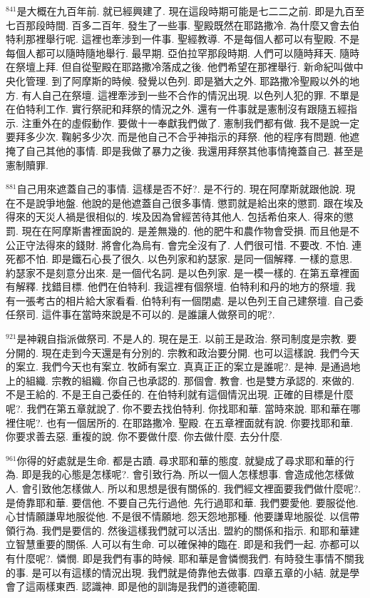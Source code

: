 \documentclass{book}
\begin{document}
$^{841}$是大概在九百年前.
就已經興建了.
現在這段時期可能是七二二之前.
即是九百至七百那段時間.
百多二百年.
發生了一些事.
聖殿既然在耶路撒冷.
為什麼又會去伯特利那裡舉行呢.
這裡也牽涉到一件事.
聖經教導.
不是每個人都可以有聖殿.
不是每個人都可以隨時隨地舉行.
最早期.
亞伯拉罕那段時期.
人們可以隨時拜天.
隨時在祭壇上拜.
但自從聖殿在耶路撒冷落成之後.
他們希望在那裡舉行.
新命紀叫做中央化管理.
到了阿摩斯的時候.
發覺以色列.
即是猶大之外.
耶路撒冷聖殿以外的地方.
有人自己在祭壇.
這裡牽涉到一些不合作的情況出現.
以色列人犯的罪.
不單是在伯特利工作.
實行祭祀和拜祭的情況之外.
還有一件事就是憲制沒有跟隨五經指示.
注重外在的虛假動作.
要做十一奉獻我們做了.
憲制我們都有做.
我不是說一定要拜多少次.
鞠躬多少次.
而是他自己不合乎神指示的拜祭.
他的程序有問題.
他遮掩了自己其他的事情.
即是我做了暴力之後.
我還用拜祭其他事情掩蓋自己.
甚至是憲制贖罪.

$^{881}$自己用來遮蓋自己的事情.
這樣是否不好?.
是不行的.
現在阿摩斯就跟他說.
現在不是說爭地盤.
他說的是他遮蓋自己很多事情.
懲罰就是給出來的懲罰.
跟在埃及得來的天災人禍是很相似的.
埃及因為曾經苦待其他人.
包括希伯來人.
得來的懲罰.
現在在阿摩斯書裡面說的.
是差無幾的.
他的肥牛和農作物會受損.
而且他是不公正守法得來的錢財.
將會化為烏有.
會完全沒有了.
人們很可惜.
不要改.
不怕.
連死都不怕.
即是鐵石心長了很久.
以色列家和約瑟家.
是同一個解釋.
一樣的意思.
約瑟家不是刻意分出來.
是一個代名詞.
是以色列家.
是一模一樣的.
在第五章裡面有解釋.
找錯目標.
他們在伯特利.
我這裡有個祭壇.
伯特利和丹的地方的祭壇.
我有一張考古的相片給大家看看.
伯特利有一個閉處.
是以色列王自己建祭壇.
自己委任祭司.
這件事在當時來說是不可以的.
是誰讓人做祭司的呢?.

$^{921}$是神親自指派做祭司.
不是人的.
現在是王.
以前王是政治.
祭司制度是宗教.
要分開的.
現在走到今天還是有分別的.
宗教和政治要分開.
也可以這樣說.
我們今天的案立.
我們今天也有案立.
牧師有案立.
真真正正的案立是誰呢?.
是神.
是通過地上的組織.
宗教的組織.
你自己也承認的.
那個會.
教會.
也是雙方承認的.
來做的.
不是王給的.
不是王自己委任的.
在伯特利就有這個情況出現.
正確的目標是什麼呢?.
我們在第五章就說了.
你不要去找伯特利.
你找耶和華.
當時來說.
耶和華在哪裡住呢?.
也有一個居所的.
在耶路撒冷.
聖殿.
在五章裡面就有說.
你要找耶和華.
你要求善去惡.
重複的說.
你不要做什麼.
你去做什麼.
去分什麼.

$^{961}$你得的好處就是生命.
都是古蹟.
尋求耶和華的態度.
就變成了尋求耶和華的行為.
即是我的心態是怎樣呢?.
會引致行為.
所以一個人怎樣想事.
會造成他怎樣做人.
會引致他怎樣做人.
所以和思想是很有關係的.
我們經文裡面要我們做什麼呢?.
是倚靠耶和華.
要信他.
不要自己先行過他.
先行過耶和華.
我們要愛他.
要服從他.
心甘情願謙卑地服從他.
不是很不情願地.
怨天怨地那種.
他要謙卑地服從.
以信帶領行為.
我們是要信的.
然後這樣我們就可以活出.
盟約的關係和指示.
和耶和華建立智慧重要的關係.
人可以有生命.
可以確保神的臨在.
即是和我們一起.
亦都可以有什麼呢?.
憐憫.
即是我們有事的時候.
耶和華是會憐憫我們.
有時發生事情不關我的事.
是可以有這樣的情況出現.
我們就是倚靠他去做事.
四章五章的小結.
就是學會了這兩樣東西.
認識神.
即是他的訓誨是我們的道德範圍.
\end{document}
